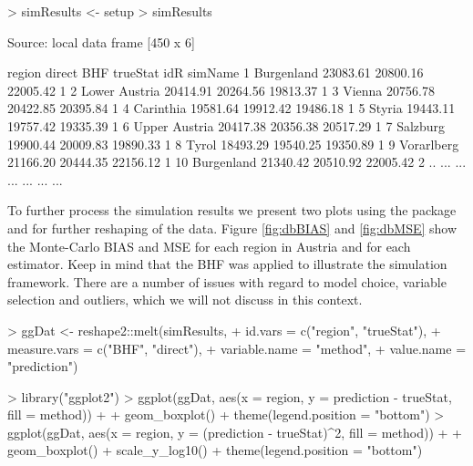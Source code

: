 \documentclass[article]{ajs}
\begin{document}
\begin{Schunk}
\begin{Sinput}
> simResults <- setup %
> simResults
\end{Sinput}
\begin{Soutput}
Source: local data frame [450 x 6]

          region   direct      BHF trueStat idR simName
1     Burgenland 23083.61 20800.16 22005.42   1        
2  Lower Austria 20414.91 20264.56 19813.37   1        
3         Vienna 20756.78 20422.85 20395.84   1        
4      Carinthia 19581.64 19912.42 19486.18   1        
5         Styria 19443.11 19757.42 19335.39   1        
6  Upper Austria 20417.38 20356.38 20517.29   1        
7       Salzburg 19900.44 20009.83 19890.33   1        
8          Tyrol 18493.29 19540.25 19350.89   1        
9     Vorarlberg 21166.20 20444.35 22156.12   1        
10    Burgenland 21340.42 20510.92 22005.42   2        
..           ...      ...      ...      ... ...     ...
\end{Soutput}
\end{Schunk}

To further process the simulation results we present two plots using the package  \citep{wickham09} and  \citep{wickham07} for further reshaping of the data. Figure \ref{fig:dbBIAS} and \ref{fig:dbMSE} show the Monte-Carlo BIAS and MSE for each region in Austria and for each estimator. Keep in mind that the BHF was applied to illustrate the simulation framework. There are a number of issues with regard to model choice, variable selection and outliers, which we will not discuss in this context.

\begin{Schunk}
\begin{Sinput}
> ggDat <- reshape2::melt(simResults,
+               id.vars = c("region", "trueStat"), 
+               measure.vars = c("BHF", "direct"), 
+               variable.name = "method",
+               value.name = "prediction")
\end{Sinput}
\end{Schunk}

\begin{Schunk}
\begin{Sinput}
> library("ggplot2")
> ggplot(ggDat, aes(x = region, y = prediction - trueStat, fill = method)) + 
+   geom_boxplot() + theme(legend.position = "bottom")
> ggplot(ggDat, aes(x = region, y = (prediction - trueStat)^2, fill = method)) + 
+   geom_boxplot() + scale_y_log10() + theme(legend.position = "bottom")
\end{Sinput}
\end{Schunk}
\end{document}

